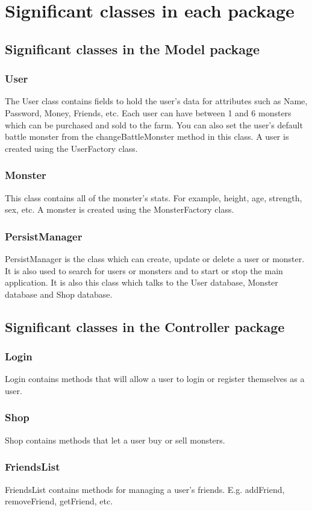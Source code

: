 \documentclass[titlepage]{article}
\begin{document}
\section{Significant classes in each package}
\subsection{Significant classes in the Model package}
\subsubsection{User}
The User class contains fields to hold the user's data for attributes such as Name, Password, Money, Friends, etc. Each user can have between 1 and 6 monsters which can be purchased and sold to the farm. You can also set the user's default battle monster from the changeBattleMonster method in this class. A user is created using the UserFactory class.
\subsubsection{Monster}
This class contains all of the monster's stats. For example, height, age, strength, sex, etc. A monster is created using the MonsterFactory class.
\subsubsection{PersistManager}
PersistManager is the class which can create, update or delete a user or monster. It is also used to search for users or monsters and to start or stop the main application. It is also this class which talks to the User database, Monster database and Shop database.
\subsection{Significant classes in the Controller package}
\subsubsection{Login}
Login contains methods that will allow a user to login or register themselves as a user.
\subsubsection{Shop}
Shop contains methods that let a user buy or sell monsters.
\subsubsection{FriendsList}
FriendsList contains methods for managing a user's friends. E.g. addFriend, removeFriend, getFriend, etc.
\end{document}
